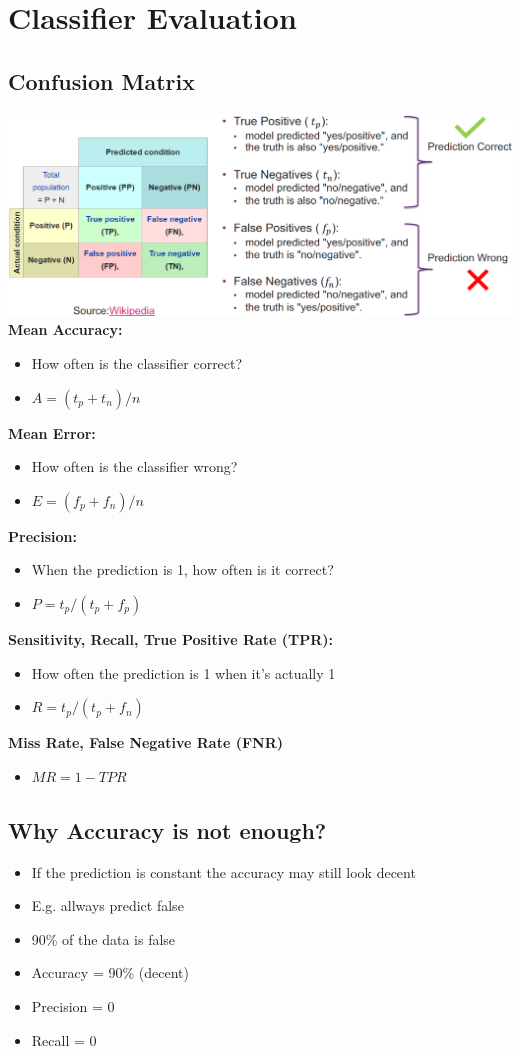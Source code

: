 \section{Classifier Evaluation}
\subsection{Confusion Matrix}
\includegraphics[width=\linewidth]{./img/confusion_matrix.png}
\textbf{Mean Accuracy:}
\begin{itemize}
    \item How often is the classifier correct?
    \item $A = (t_p + t_n) / n$
\end{itemize}
\textbf{Mean Error:}
\begin{itemize}
    \item How often is the classifier wrong?
    \item $E = (f_p + f_n) / n$
\end{itemize}
\textbf{Precision:}
\begin{itemize}
    \item When the prediction is 1, how often is it correct?
    \item $P = t_p / (t_p + f_p)$
\end{itemize}
\textbf{Sensitivity, Recall, True Positive Rate (TPR):}
\begin{itemize}
    \item How often the prediction is 1 when it's actually 1
    \item $R = t_p / (t_p + f_n)$
\end{itemize}
\textbf{Miss Rate, False Negative Rate (FNR)}
\begin{itemize}
    \item $MR = 1 - TPR$
\end{itemize}

\subsection{Why Accuracy is not enough?}
\begin{itemize}
    \item If the prediction is constant the accuracy may still look decent
    \item E.g. allways predict false
    \item 90\% of the data is false
    \item Accuracy = 90\% (decent)
    \item Precision = 0
    \item Recall = 0
\end{itemize}


